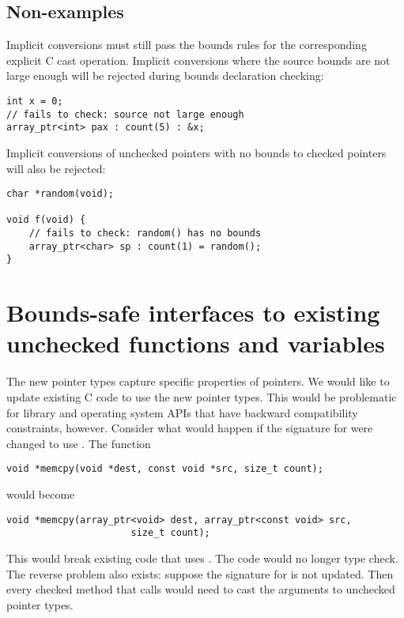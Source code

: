 \subsection{Non-examples}

Implicit conversions must still pass the bounds rules for the corresponding explicit
C cast operation.  Implicit conversions where the source bounds are not large
enough will be rejected during bounds declaration checking:
\begin{lstlisting}
int x = 0;
// fails to check: source not large enough
array_ptr<int> pax : count(5) : &x;
\end{lstlisting}

Implicit conversions of unchecked pointers with no bounds to checked pointers
will also be rejected:
\begin{lstlisting}
char *random(void);

void f(void) {
    // fails to check: random() has no bounds
    array_ptr<char> sp : count(1) = random(); 
}
\end{lstlisting}

\section{Bounds-safe interfaces to existing unchecked functions and variables}
\label{section:function-bounds-safe-interfaces}

The new pointer types capture specific properties of pointers. We would like to update
existing C code to use the new pointer types. This would be problematic for library and operating
system APIs that have backward  compatibility constraints, however.   Consider what would happen
if the signature for  were changed to use \arrayptr. The function

\begin{lstlisting}
void *memcpy(void *dest, const void *src, size_t count);
\end{lstlisting}

would become

\begin{lstlisting}
void *memcpy(array_ptr<void> dest, array_ptr<const void> src,
                      size_t count);
\end{lstlisting}

This would break existing code that uses .  The code would no
longer type check.  The reverse problem also exists: suppose the signature for
 is not updated.  Then every checked method that calls
 would need to cast the arguments to unchecked pointer types.

